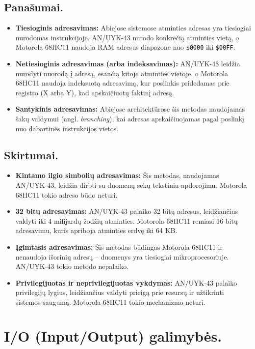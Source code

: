 \documentclass[a4paper,12pt]{article}
\begin{document}
\subsection*{Panašumai.}
\begin{itemize}
    \item \textbf{Tiesioginis adresavimas:} Abiejose sistemose atminties adresas yra tiesiogiai nurodomas instrukcijoje. 
    AN/UYK-43 nurodo konkrečią atminties vietą, o Motorola 68HC11 naudoja RAM adresus diapazone nuo \texttt{\$0000} iki \texttt{\$00FF}.
    \item \textbf{Netiesioginis adresavimas (arba indeksavimas):} 
    AN/UYK-43 leidžia nurodyti nuorodą į adresą, esančią kitoje atminties vietoje, o Motorola 68HC11 naudoja indeksuotą adresavimą, kur poslinkis pridedamas prie registro (X arba Y), kad apskaičiuotų faktinį adresą.
    \item \textbf{Santykinis adresavimas:} Abiejose architektūrose šis metodas naudojamas šakų valdymui (angl. \textit{branching}), kai adresas apskaičiuojamas pagal poslinkį nuo dabartinės instrukcijos vietos.
\end{itemize}
\subsection*{Skirtumai.}
\begin{itemize}
    \item \textbf{Kintamo ilgio simbolių adresavimas:} 
    Šis metodas, naudojamas AN/UYK-43, leidžia dirbti su duomenų sekų tekstiniu apdorojimu. Motorola 68HC11 tokio adreso būdo neturi.
    \item \textbf{32 bitų adresavimas:} 
    AN/UYK-43 palaiko 32 bitų adresus, leidžiančius valdyti iki 4 milijardų žodžių atminties. Motorola 68HC11 remiasi 16 bitų adresavimu, kuris apriboja atminties erdvę iki 64 KB.
    \item \textbf{Įgimtasis adresavimas:} 
    Šis metodas būdingas Motorola 68HC11 ir nenaudoja išorinių adresų – duomenys yra tiesiogiai mikroprocesoriuje. AN/UYK-43 tokio metodo nepalaiko.
    \item \textbf{Privilegijuotas ir neprivilegijuotas vykdymas:} 
    AN/UYK-43 palaiko privilegijų lygius, leidžiančius valdyti prieigą prie resursų ir užtikrinti sistemos saugumą. Motorola 68HC11 tokio mechanizmo neturi.
\end{itemize}

\section{I/O (Input/Output) galimybės.}
\end{document}
